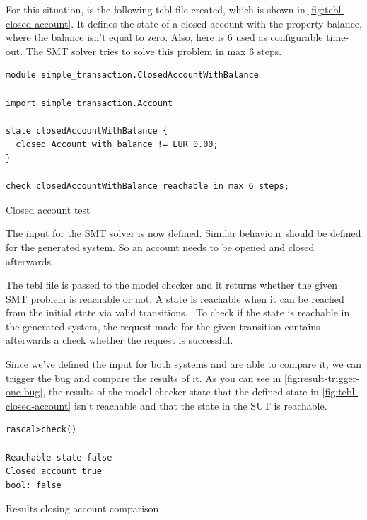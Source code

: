 For this situation, is the following tebl file created, which is shown in
\autoref{fig:tebl-closed-account}. It defines the state of a closed account with
the property balance, where the balance isn't equal to zero. Also, here is 6
used as configurable time-out. The SMT solver tries to solve this problem in
max 6 steps.

\begin{sourcecode}[h!]
\begin{lstlisting}[]
module simple_transaction.ClosedAccountWithBalance

import simple_transaction.Account

state closedAccountWithBalance {
  closed Account with balance != EUR 0.00;
}

check closedAccountWithBalance reachable in max 6 steps;
\end{lstlisting}
\caption{Closed account test}\label{fig:tebl-closed-account}
\end{sourcecode}

The input for the SMT solver is now defined. Similar behaviour should be defined
for the generated system. So an account needs to be opened and closed
afterwards.

The tebl file is passed to the model checker and it returns whether the given
SMT problem is reachable or not. A state is reachable when it can be reached
from the initial state via valid
transitions.~\cite[p.~4]{stoel_storm_vinju_bosman_2016} To check if the state is
reachable in the generated system, the request made for the given transition
contains afterwards a check whether the request is successful.

Since we've defined the input for both systems and are able to compare it, we
can trigger the bug and compare the results of it. As you can see in
\autoref{fig:result-trigger-one-bug}, the results of the model checker state
that the defined state in \autoref{fig:tebl-closed-account} isn't reachable and
that the state in the SUT is reachable.

\begin{sourcecode}[h!]
\begin{lstlisting}[]
rascal>check()

Reachable state false
Closed account true
bool: false
\end{lstlisting}
\caption{Results closing account comparison}\label{fig:result-trigger-one-bug}
\end{sourcecode}

